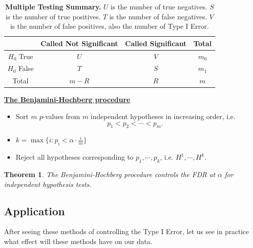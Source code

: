 \documentclass[12pt]{article}
\theoremstyle{plain}
\newtheorem{theorem}{Theorem}
\theoremstyle{definition}
\theoremstyle{remark}
\begin{document}
\begin{table}[h]
    \centering
    \begin{tabular}{|c|c|c|c|}
    \hline
    & Called Not Significant & Called Significant & Total \\
    \hline
    $H_0$  True & $U$ & $V$ & $m_0$\\
    \hline
    $H_0$  False & $T$ & $S$ & $m_1$\\
    \hline
    Total & $m-R$ & $R$ & $m$\\
    \hline
    \end{tabular}
    \caption{\textbf{Multiple Testing Summary.} $U$ is the number of true negatives. $S$ is the number of true positives. $T$ is the number of false negatives. $V$ is the number of false positives, also the number of Type I Error.}
    \label{table 3}
\end{table}

\underline{\textbf{The Benjamini-Hochberg procedure}}\cite{5.3}
\begin{itemize}
    \item Sort $m$ $p$-values from $m$ independent hypotheses in increasing order, i.e. \[p_1<p_2<\cdots<p_m.\]
    \item $k=\max\{i: p_i<\alpha\cdot \frac{i}{m}\}$
    \item Reject all hypotheses corresponding to $p_1,\cdots,p_k$, i.e. $H^1,\cdots,H^k$.
\end{itemize}

\begin{theorem}
The Benjamini-Hochberg procedure controls the FDR at $\alpha$
for independent hypothesis tests.
\end{theorem}





\newpage
\subsection{Application}
After seeing these methods of controlling the Type I Error, let us see in practice what effect will these methods have on our data.



















\newpage
\end{document}
